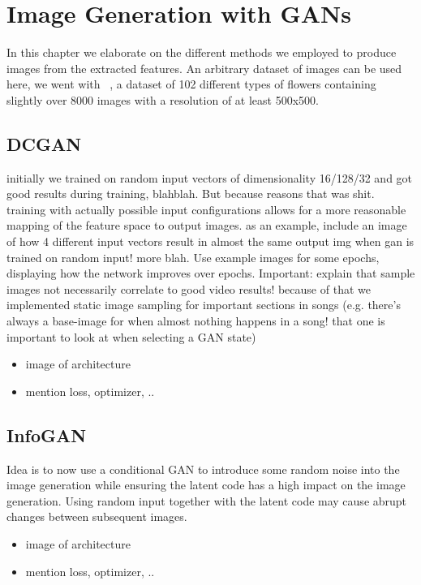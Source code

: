 \chapter{Image Generation with GANs}
    In this chapter we elaborate on the different methods we employed to produce images from the extracted features. An arbitrary dataset of images can be used here, we went with ~\cite{102flower}, a dataset of 102 different types of flowers containing slightly over 8000 images with a resolution of at least 500x500.
    
    \section{DCGAN}
        initially we trained on random input vectors of dimensionality 16/128/32 and got good results during training, blahblah. But because reasons that was shit. training with actually possible input configurations allows for a more reasonable mapping of the feature space to output images. as an example, include an image of how 4 different input vectors result in almost the same output img when gan is trained on random input! more blah. Use example images for some epochs, displaying how the network improves over epochs. Important: explain that sample images not necessarily correlate to good video results! because of that we implemented static image sampling for important sections in songs (e.g. there's always a base-image for when almost nothing happens in a song! that one is important to look at when selecting a GAN state)
        \begin{itemize}
            \item image of architecture
            \item mention loss, optimizer, ..
        \end{itemize}

    \section{InfoGAN}
        Idea is to now use a conditional GAN to introduce some random noise into the image generation while ensuring the latent code has a high impact on the image generation. Using random input together with the latent code may cause abrupt changes between subsequent images.
        \begin{itemize}
            \item image of architecture
            \item mention loss, optimizer, ..
        \end{itemize}

